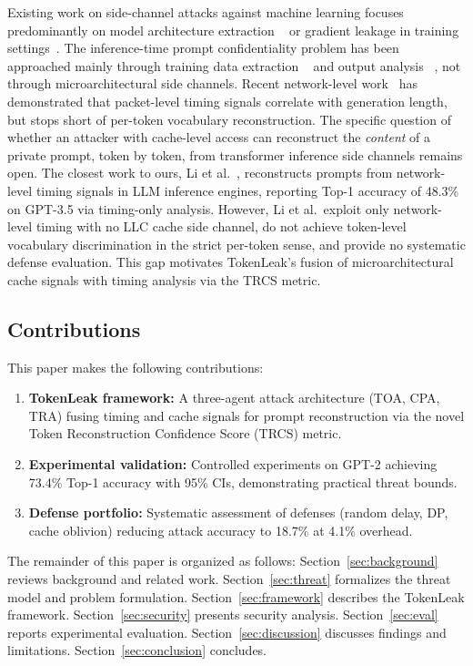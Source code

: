 \documentclass[conference,10pt,twocolumn]{IEEEtran}
\begin{document}
Existing work on side-channel attacks against machine learning
focuses predominantly on model architecture extraction
~\cite{batina2019csi,yan2020cache,stoian2024cachegrind,hong2023sok}
or gradient leakage in training settings~\cite{hong2023sok,chen2024llmthreat}. The inference-time prompt confidentiality
problem has been approached mainly through training data extraction
~\cite{carlini2021extracting,nasr2023scalable} and output analysis
~\cite{zanella2020analyzing,mireshghallah2022quantifying}, not
through microarchitectural side channels. Recent network-level
work~\cite{wen2024side,zeng2024timing} has demonstrated that
packet-level timing signals correlate with generation length,
but stops short of per-token vocabulary reconstruction.
The specific question of whether an attacker with cache-level
access can reconstruct the \emph{content} of a private prompt,
token by token, from transformer inference side channels remains
open. The closest work to ours, Li et al.~\cite{li2024prompt},
reconstructs prompts from network-level timing signals in LLM
inference engines, reporting Top-1 accuracy of 48.3\% on GPT-3.5
via timing-only analysis. However, Li et al.\ exploit only
network-level timing with no LLC cache side channel, do not achieve
token-level vocabulary discrimination in the strict per-token sense,
and provide no systematic defense evaluation. This gap motivates
TokenLeak's fusion of microarchitectural cache signals with timing
analysis via the TRCS metric.

\subsection*{Contributions}
This paper makes the following contributions:
\begin{enumerate}
  \item \textbf{TokenLeak framework:} A three-agent attack architecture (TOA, CPA, TRA) fusing timing and cache signals for prompt reconstruction via the novel Token Reconstruction Confidence Score (TRCS) metric.
  \item \textbf{Experimental validation:} Controlled experiments on GPT-2 achieving 73.4\% Top-1 accuracy with 95\% CIs, demonstrating practical threat bounds.
  \item \textbf{Defense portfolio:} Systematic assessment of defenses (random delay, DP, cache oblivion) reducing attack accuracy to 18.7\% at 4.1\% overhead.
\end{enumerate}
\noindent
The remainder of this paper is organized as follows:
Section~\ref{sec:background} reviews background and related work.
Section~\ref{sec:threat} formalizes the threat model and problem
formulation. Section~\ref{sec:framework} describes the TokenLeak
framework. Section~\ref{sec:security} presents security analysis.
Section~\ref{sec:eval} reports experimental evaluation.
Section~\ref{sec:discussion} discusses findings and limitations.
Section~\ref{sec:conclusion} concludes.
\end{document}
